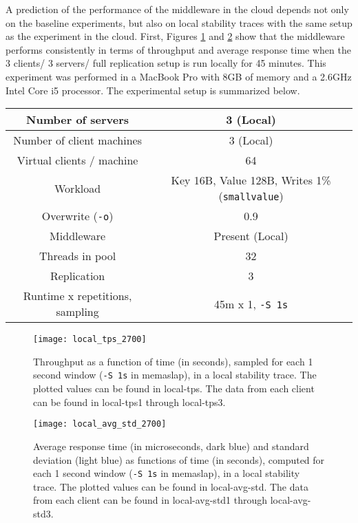 \documentclass[11pt]{article}
\begin{document}
A prediction of the performance of the middleware in the cloud depends not only on the baseline experiments, but also on local stability traces with the same setup as the experiment in the cloud. First, Figures \ref{local:tps} and \ref{local:avg-std} show that the middleware performs consistently in terms of throughput and average response time when the 3 clients/ 3 servers/ full replication setup is run locally for 45 minutes. This experiment was performed in a MacBook Pro with 8GB of memory and a 2.6GHz Intel Core i5 processor. The experimental setup is summarized below.

\small{
	\smallskip
	\begin{tabular}{|c|c|}
		\hline Number of servers & 3 (Local) \\ 
		\hline Number of client machines & 3 (Local) \\ 
		\hline Virtual clients / machine & 64 \\ 
		\hline Workload & Key 16B, Value 128B, Writes 1\% (\texttt{smallvalue}) \\
		\hline Overwrite (\texttt{-o}) & 0.9\\
		\hline Middleware & Present (Local)\\ 
		\hline Threads in pool & 32\\
		\hline Replication & 3\\
		\hline Runtime x repetitions, sampling & 45m x 1, \texttt{-S 1s} \\
		\hline
	\end{tabular} }

\begin{figure}[H]
	\centering
	\texttt{[image: local\_tps\_2700]}
	\caption{Throughput as a function of time (in seconds), sampled for each 1 second window (\texttt{-S 1s} in memaslap), in a local stability trace. The plotted values can be found in local-tps. The data from each client can be found in local-tps1 through local-tps3.}
	\label{local:tps}
\end{figure}

\begin{figure}[H]
	\centering
	\texttt{[image: local\_avg\_std\_2700]}
	\caption{Average response time (in microseconds, dark blue) and standard deviation (light blue) as functions of time (in seconds), computed for each 1 second window (\texttt{-S 1s} in memaslap), in a local stability trace. The plotted values can be found in local-avg-std. The data from each client can be found in local-avg-std1 through local-avg-std3.}
	\label{local:avg-std}
\end{figure}
\end{document}

